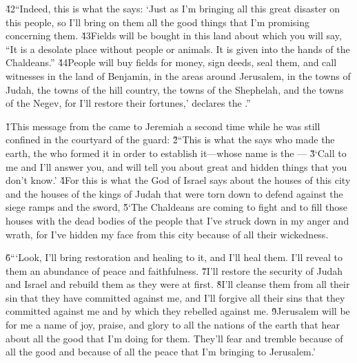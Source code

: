 \v{42}``Indeed, this is what the  says: `Just as I'm bringing all this great disaster on this people, so I'll bring on them all the good things that I'm promising concerning them. \v{43}Fields will be bought in this land about which you will say, ``It is a desolate place without people or animals. It is given into the hands of the Chaldeans.'' \v{44}People will buy fields for money, sign deeds, seal them, and call witnesses in the land of Benjamin, in the areas around Jerusalem, in the towns of Judah, the towns of the hill country, the towns of the Shephelah, and the towns of the Negev, for I'll restore their fortunes,' declares the .''

\v{1}This message from the  came to Jeremiah a second time while he was still confined in the courtyard of the guard: \v{2}``This is what the  says who made the earth, the  who formed it in order to establish it---whose name is the --- \v{3}`Call to me and I'll answer you, and will tell you about great and hidden things that you don't know.' \v{4}For this is what the  God of Israel says about the houses of this city and the houses of the kings of Judah that were torn down to defend against the siege ramps and the sword, \v{5}`The Chaldeans are coming to fight and to fill those houses with the dead bodies of the people that I've struck down in my anger and wrath, for I've hidden my face from this city because of all their wickedness.

\v{6}```Look, I'll bring restoration and healing to it, and I'll heal them. I'll reveal to them an abundance of peace and faithfulness. \v{7}I'll restore the security of Judah and Israel and rebuild them as they were at first. \v{8}I'll cleanse them from all their sin that they have committed against me, and I'll forgive all their sins that they committed against me and by which they rebelled against me. \v{9}Jerusalem will be for me a name of joy, praise, and glory to all the nations of the earth that hear about all the good that I'm doing for them. They'll fear and tremble because of all the good and because of all the peace that I'm bringing to Jerusalem.'

